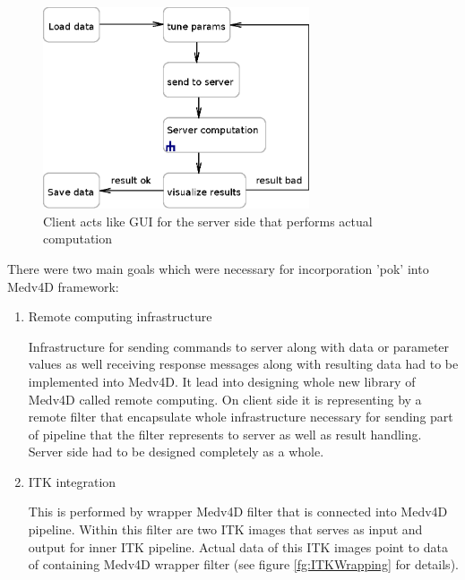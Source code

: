 \begin{figure}
    \centering
    \includegraphics[width=0.7\textwidth]{data/computationProcess}
    \caption[RemoteCellLevelSet application computation process]{Client acts like GUI for the server side that performs actual computation}
    \label{fg:computationProcess}
\end{figure}

\par
There were two main goals which were necessary for incorporation 'pok' into
Medv4D framework:
\begin{enumerate}

  \item{Remote computing infrastructure}
  \par
  Infrastructure for sending commands to server along with data or parameter values as well receiving response messages along with resulting data had to be implemented into Medv4D.
It lead into designing whole new library of Medv4D called remote computing.
On client side it is representing by a remote filter that encapsulate whole infrastructure necessary for sending part of pipeline that the filter represents to server as well as result handling.
Server side had to be designed completely as a whole.

  \item{ITK integration}
  \par
  This is performed by wrapper Medv4D filter that is connected into Medv4D pipeline.
Within this filter are two ITK images that serves as input and output for inner ITK pipeline.
Actual data of this ITK images point to data of containing Medv4D wrapper filter (see figure \ref{fg:ITKWrapping} for details).

\end{enumerate}


